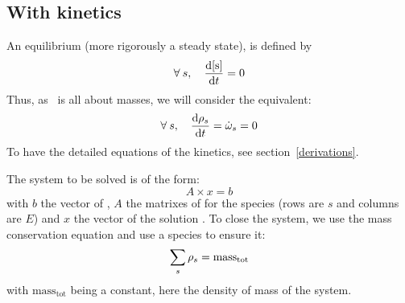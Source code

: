 \subsection{With kinetics}
An equilibrium (more rigorously a steady state), is defined
by
\begin{equation}
\forall\:s,\quad \doverdt{\conc[s]} = 0
\label{equilibrium:def}
\end{equation}
Thus, as \antioch\ is all about masses, we will consider
the equivalent:
\begin{equation}
\forall\:s,\quad \doverdt{\mass[s]} = \mdot[s] = 0
\label{equilibrium:def_by_mass}
\end{equation}
To have the detailed equations of the kinetics, see
section~\ref{derivations}.

The system to be solved is of the form:
\begin{equation}
A\times x = b
\end{equation}
with $b$ the vector of \mdot, $A$ the matrixes of \doverdm[E]{\mdot[s]} for
the species (rows are $s$ and columns are $E$) and $x$ the vector of the solution \mass.
To close the system, we use the mass conservation equation and use a
species to ensure it:
\begin{equation}
\sum_s \mass[s] = \mathrm{mass_{tot}}
\label{mass_cons}
\end{equation}
with $\mathrm{mass_{tot}}$ being a constant, here the density of mass of the system.

